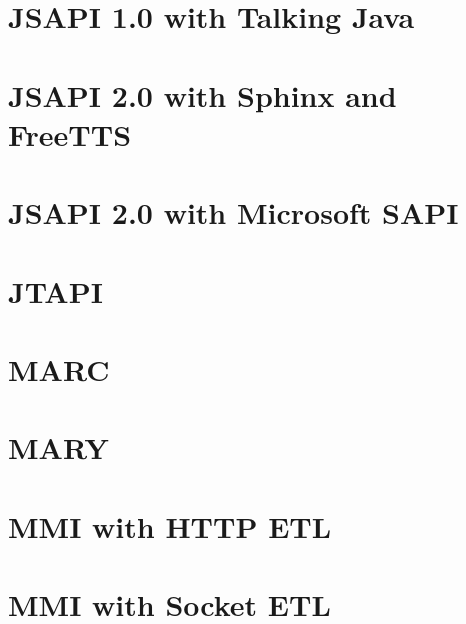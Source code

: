 \documentclass[11pt,a4paper]{book}
\begin{document}
\section{JSAPI 1.0 with Talking Java}


\section{JSAPI 2.0 with Sphinx and FreeTTS}


\section{JSAPI 2.0 with Microsoft SAPI}


\section{JTAPI}


\section{MARC}


\section{MARY}


\section{MMI with HTTP ETL}


\section{MMI with Socket ETL}

\end{document}
